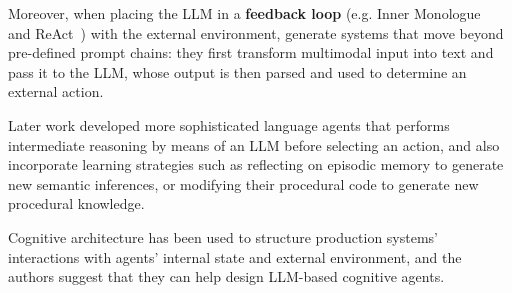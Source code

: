 Moreover, when placing the \ac{LLM} in a \textbf{feedback loop} (e.g. Inner
Monologue~\cite{huang2022innermonologueembodiedreasoning} and
ReAct~\cite{yao2023reactsynergizingreasoningacting}) with the external
environment, generate systems that move beyond pre-defined prompt chains: they
first transform multimodal input into text and pass it to the \ac{LLM}, whose
output is then parsed and used to determine an external action.

Later work developed more sophisticated language agents that performs
intermediate reasoning by means of an \ac{LLM} before selecting an action, and
also incorporate learning strategies such as reflecting on episodic memory to
generate new semantic inferences, or modifying their procedural code to
generate new procedural knowledge.

Cognitive architecture has been used to structure production systems'
interactions with agents' internal state and external environment, and the
authors suggest that they can help design \ac{LLM}-based cognitive agents.
